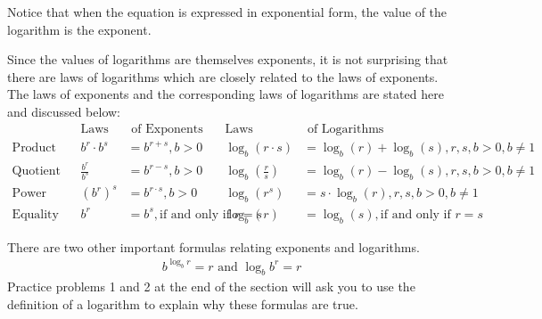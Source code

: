 \documentclass[10pt,]{book}
\theoremstyle{plain}
\theoremstyle{definition}
\theoremstyle{definition}
\theoremstyle{definition}
\numberwithin{equation}{section}
\newcommand{\amp}{&}
\begin{document}
\hypertarget{p-286}{}%
Notice that when the equation is expressed in exponential form, the value of the logarithm is the exponent.%
\par
\hypertarget{p-287}{}%
Since the values of logarithms are themselves exponents, it is not surprising that there are laws of logarithms which are closely related to the laws of exponents.  The laws of exponents and the corresponding laws of logarithms are stated here and discussed below:%
\begin{align*}
\text{} \amp \amp \text{Laws} \amp \text{ of Exponents} \amp \text{Laws} \amp \text{ of Logarithms}\\
\text{Product} \amp \amp b^r \cdot b^s \amp = b^{r+s}, b>0 \amp \log_b\left(r \cdot s\right) \amp = \log_b(r) + \log_b(s), r, s, b > 0, b \neq 1\\
\text{Quotient} \amp \amp \frac{b^r}{b^s} \amp = b^{r-s}, b>0 \amp \log_b\left( \frac{r}{s} \right) \amp = \log_b(r) - \log_b(s), r, s, b > 0, b \neq 1\\
\text{Power} \amp \amp \left( b^r \right) ^ s \amp = b^{r \cdot s}, b>0 \amp \log_b\left(r ^ s\right) \amp = s \cdot \log_b(r), r, s, b > 0, b \neq 1\\
\text{Equality} \amp \amp b^r \amp = b^s, \text{if and only if } r = s \amp \log_b\left( r \right) \amp = \log_b\left( s \right), \text{if and only if } r = s
\end{align*}
%
\par
\hypertarget{p-288}{}%
There are two other important formulas relating exponents and logarithms.%
\begin{gather*}
b ^ {\log_b r} = r \text{ and } \log_b b^r = r
\end{gather*}
Practice problems 1 and 2 at the end of the section will ask you to use the definition of a logarithm to explain why these formulas are true.%
\end{document}
